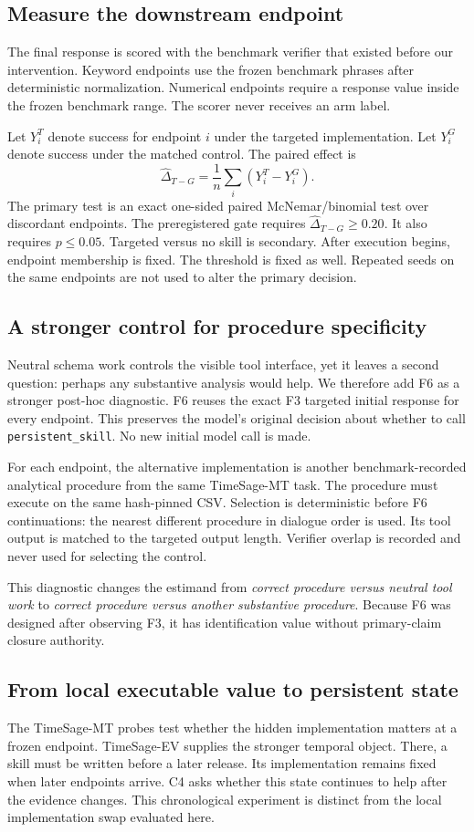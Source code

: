 \subsection{Measure the downstream endpoint}
The final response is scored with the benchmark verifier that existed before our intervention. Keyword endpoints use the frozen benchmark phrases after deterministic normalization. Numerical endpoints require a response value inside the frozen benchmark range. The scorer never receives an arm label.

Let $Y_i^T$ denote success for endpoint $i$ under the targeted implementation. Let $Y_i^G$ denote success under the matched control. The paired effect is
\begin{equation}
\widehat{\Delta}_{T-G}=\frac{1}{n}\sum_i (Y_i^T-Y_i^G).
\end{equation}
The primary test is an exact one-sided paired McNemar/binomial test over discordant endpoints. The preregistered gate requires $\widehat{\Delta}_{T-G}\geq0.20$. It also requires $p\leq0.05$. Targeted versus no skill is secondary. After execution begins, endpoint membership is fixed. The threshold is fixed as well. Repeated seeds on the same endpoints are not used to alter the primary decision.

\subsection{A stronger control for procedure specificity}
Neutral schema work controls the visible tool interface, yet it leaves a second question: perhaps any substantive analysis would help. We therefore add F6 as a stronger post-hoc diagnostic. F6 reuses the exact F3 targeted initial response for every endpoint. This preserves the model's original decision about whether to call \texttt{persistent\_skill}. No new initial model call is made.

For each endpoint, the alternative implementation is another benchmark-recorded analytical procedure from the same TimeSage-MT task. The procedure must execute on the same hash-pinned CSV. Selection is deterministic before F6 continuations: the nearest different procedure in dialogue order is used. Its tool output is matched to the targeted output length. Verifier overlap is recorded and never used for selecting the control.

This diagnostic changes the estimand from \emph{correct procedure versus neutral tool work} to \emph{correct procedure versus another substantive procedure}. Because F6 was designed after observing F3, it has identification value without primary-claim closure authority.

\subsection{From local executable value to persistent state}
The TimeSage-MT probes test whether the hidden implementation matters at a frozen endpoint. TimeSage-EV supplies the stronger temporal object. There, a skill must be written before a later release. Its implementation remains fixed when later endpoints arrive. C4 asks whether this state continues to help after the evidence changes. This chronological experiment is distinct from the local implementation swap evaluated here.
